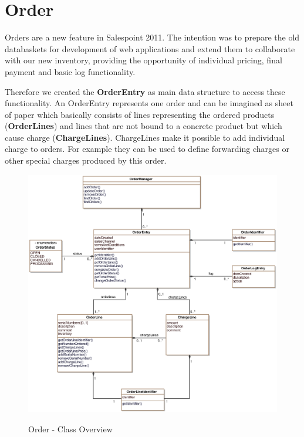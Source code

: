 \newpage
\section{Order}
Orders are a new feature in Salespoint 2011. The intention was to prepare the old databaskets for development of web applications and extend them to collaborate with our new inventory, providing the opportunity of individual pricing, final payment and basic log functionality.

Therefore we created the \textbf{OrderEntry} as main data structure to access these functionality. An OrderEntry represents one order and can be imagined as sheet of paper which basically consists of lines representing the ordered products (\textbf{OrderLines}) and lines that are not bound to a concrete product but which cause charge (\textbf{ChargeLines}). ChargeLines make it possible to add individual charge to orders. For example they can be used to define forwarding charges or other special charges produced by this order. 

\vskip 1cm

\begin{figure}[ht]
	\centering
  \includegraphics[scale =.7]{images/overview_order.eps}
	\label{order_overview}
	\caption{Order - Class Overview}
\end{figure}


